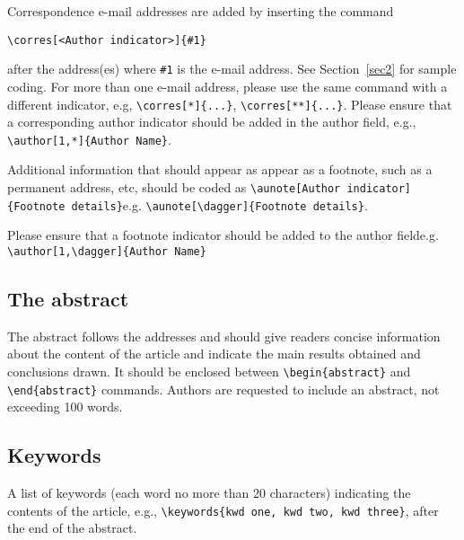 \documentclass{OUP-EJ}
\begin{document}
\noindent Correspondence e-mail addresses are added by inserting the
command\medskip

\noindent
\verb"\corres[<Author indicator>]{#1}"\medskip

\noindent
after the address(es) where \verb"#1" is the e-mail address.
See Section~\ref{sec2} for sample coding. For more than one e-mail address, please use the same command with a different indicator, e.g, \verb+\corres[*]{...}+, \verb+\corres[**]{...}+.
Please ensure that a corresponding author indicator should be added in the author field, e.g., \verb+\author[1,*]{Author Name}+.
\bigskip

\noindent
Additional information that should appear as  appear as a footnote, such as a permanent address, etc, should be coded as \verb"\aunote[Author indicator]{Footnote details}"\newline e.g. \verb"\aunote[\dagger]{Footnote details}".

\smallskip

\noindent
Please ensure that a footnote indicator should be added to the author field\newline e.g. \verb+\author[1,\dagger]{Author Name}+


\subsection{The abstract}

The abstract follows the addresses and
should give readers concise information about the content
of the article and indicate the main results obtained and conclusions
drawn.  It should be enclosed between \verb"\begin{abstract}"
and \verb"\end{abstract}" commands.
Authors are requested to include an abstract, not exceeding 100 words.



\subsection{Keywords}
A list of keywords (each word no more than 20 characters) indicating the contents of the article,
e.g., \verb"\keywords{kwd one, kwd two, kwd three}", after the end of the abstract.
\end{document}
